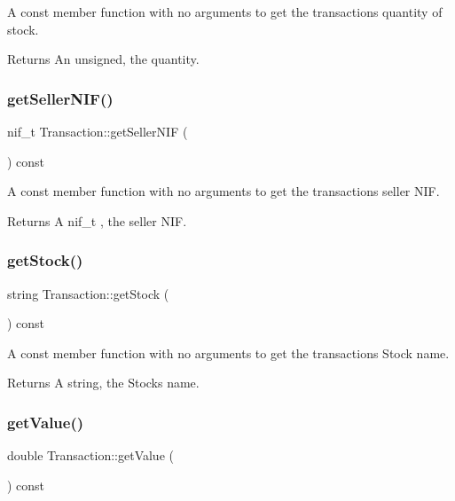 A const member function with no arguments to get the transaction\textquotesingle{}s quantity of stock. \begin{DoxyReturn}{Returns}
An unsigned, the quantity. 
\end{DoxyReturn}
\mbox{\label{class_transaction_a3c3a57a3240bece392c56ff41bc3c21b}} 
\subsubsection{\texorpdfstring{get\+Seller\+N\+I\+F()}{getSellerNIF()}}
{\footnotesize\ttfamily nif\+\_\+t Transaction\+::get\+Seller\+N\+IF (\begin{DoxyParamCaption}{ }\end{DoxyParamCaption}) const}

A const member function with no arguments to get the transaction\textquotesingle{}s seller N\+IF. \begin{DoxyReturn}{Returns}
A nif\+\_\+t , the seller N\+IF. 
\end{DoxyReturn}
\mbox{\label{class_transaction_af6582ddc59e9cfa99a7ef178216799be}} 
\subsubsection{\texorpdfstring{get\+Stock()}{getStock()}}
{\footnotesize\ttfamily string Transaction\+::get\+Stock (\begin{DoxyParamCaption}{ }\end{DoxyParamCaption}) const}

A const member function with no arguments to get the transaction\textquotesingle{}s Stock name. \begin{DoxyReturn}{Returns}
A string, the Stock\textquotesingle{}s name. 
\end{DoxyReturn}
\mbox{\label{class_transaction_a95976b2e60b66d766edf4db534324db4}} 
\subsubsection{\texorpdfstring{get\+Value()}{getValue()}}
{\footnotesize\ttfamily double Transaction\+::get\+Value (\begin{DoxyParamCaption}{ }\end{DoxyParamCaption}) const}

